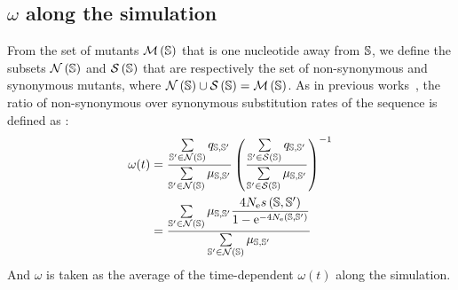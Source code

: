 \subsection{\texorpdfstring{$\omega$}{ω} along the simulation}
From the set of mutants $\mathcal{M}\left(\mathbb{S}\right)$ that is one nucleotide away from $\mathbb{S}$, we define the subsets $\mathcal{N}\left(\mathbb{S}\right)$ and $\mathcal{S}\left(\mathbb{S}\right)$ that are respectively the set of non-synonymous and synonymous mutants, where $\mathcal{N}\left(\mathbb{S}\right) \cup \mathcal{S}\left(\mathbb{S}\right) = \mathcal{M}\left(\mathbb{S}\right)$.
As in previous works~\citep{Spielman2015, DosReis2015, Jones2016}, the ratio of non-synonymous over synonymous substitution rates of the sequence is defined as :
\begin{align}
    \omega(t) &= \dfrac{\sum\limits_{\mathbb{S}' \in \mathcal{N}\left(\mathbb{S}\right)} q_{\mathbb{S}, \mathbb{S}'}}{\sum\limits_{\mathbb{S}' \in \mathcal{N}\left(\mathbb{S}\right)} \mu_{\mathbb{S}, \mathbb{S}'}} \left( \dfrac{\sum\limits_{\mathbb{S}' \in \mathcal{S}\left(\mathbb{S}\right)} q_{\mathbb{S}, \mathbb{S}'}}{\sum\limits_{\mathbb{S}' \in \mathcal{S}\left(\mathbb{S}\right)} \mu_{\mathbb{S}, \mathbb{S}'}} \right)^{-1}\\
    &= \dfrac{\sum\limits_{\mathbb{S}' \in \mathcal{N}\left(\mathbb{S}\right)} \mu_{\mathbb{S}, \mathbb{S}'} \dfrac{4 N_{\mathrm{e}} s \left( \mathbb{S},\mathbb{S}'\right)}{{1 - \mathrm{e}^{-4 N_{\mathrm{e}} \left( \mathbb{S},\mathbb{S}'\right)} }}}{\sum\limits_{\mathbb{S}' \in \mathcal{N}\left(\mathbb{S}\right)} \mu_{\mathbb{S}, \mathbb{S}'}}
\end{align}
And $\omega$ is taken as the average of the time-dependent $\omega(t)$ along the simulation.